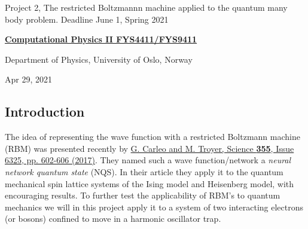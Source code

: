 \documentclass[%
oneside,                 %
final,                   %
10pt]{article}
\begin{document}

\newcommand{\exercisesection}[1]{\subsection*{#1}}






\thispagestyle{empty}

\begin{center}
{\LARGE\bf
\begin{spacing}{1.25}
Project 2, The restricted Boltzmannn machine applied to the quantum many body problem. Deadline June 1, Spring 2021
\end{spacing}
}
\end{center}


\begin{center}
{\bf \href{{http://www.uio.no/studier/emner/matnat/fys/FYS4411/index-eng.html}}{Computational Physics II FYS4411/FYS9411}}
\end{center}

    \begin{center}
\centerline{{\small Department of Physics, University of Oslo, Norway}}
\end{center}
    

\begin{center}
Apr 29, 2021
\end{center}

\vspace{1cm}


\subsection*{Introduction}

The idea of representing the wave function with
a restricted Boltzmann machine (RBM) was presented recently by \href{{http://science.sciencemag.org/content/355/6325/602}}{G. Carleo and M. Troyer, Science \textbf{355}, Issue 6325, pp. 602-606 (2017)}. They
named such a wave function/network a \textit{neural network quantum
state} (NQS). In their article they apply it to the quantum mechanical
spin lattice systems of the Ising model and Heisenberg model, with
encouraging results. To further test the applicability of RBM's to
quantum mechanics we will in this project apply it to a system of
two interacting electrons (or bosons) confined to move in a harmonic oscillator trap.
\end{document}
